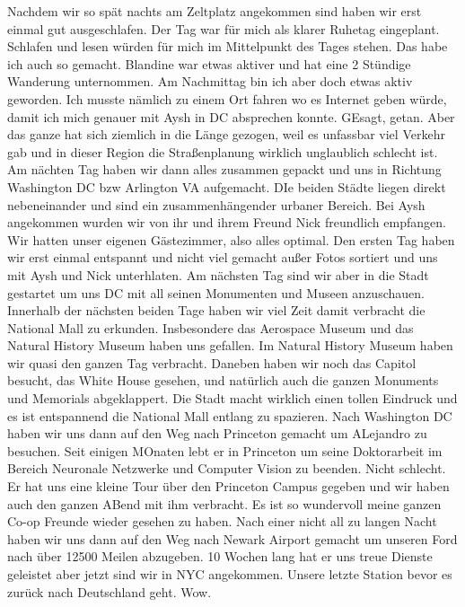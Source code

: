 \documentclass[11pt]{book}
\begin{document}
Nachdem wir so spät nachts am Zeltplatz angekommen sind haben wir erst einmal gut ausgeschlafen. Der Tag war für mich als klarer Ruhetag eingeplant. Schlafen und 
lesen würden für mich im Mittelpunkt des Tages stehen. Das habe ich auch so gemacht. Blandine war etwas aktiver und hat eine 2 Stündige Wanderung unternommen. 
Am Nachmittag bin ich aber doch etwas aktiv geworden. Ich musste nämlich zu einem Ort fahren wo es Internet geben würde, damit ich mich genauer mit Aysh in DC 
absprechen konnte. GEsagt, getan. Aber das ganze hat sich ziemlich in die Länge gezogen, weil es unfassbar viel Verkehr gab und in dieser Region die Straßenplanung 
wirklich unglaublich schlecht ist. Am nächten Tag haben wir dann alles zusammen gepackt und uns in Richtung Washington DC bzw Arlington VA aufgemacht. DIe beiden 
Städte liegen direkt nebeneinander und sind ein zusammenhängender urbaner Bereich. Bei Aysh angekommen wurden wir von ihr und ihrem Freund Nick freundlich 
empfangen. Wir hatten unser eigenen Gästezimmer, also alles optimal. Den ersten Tag haben wir erst einmal entspannt und nicht viel gemacht außer Fotos sortiert 
und uns mit Aysh und Nick unterhlaten. Am nächsten Tag sind wir aber in die Stadt gestartet um uns DC mit all seinen Monumenten und Museen anzuschauen. Innerhalb 
der nächsten beiden Tage haben wir viel Zeit damit verbracht die National Mall zu erkunden. Insbesondere das Aerospace Museum und das Natural History Museum haben 
uns gefallen. Im Natural History Museum haben wir quasi den ganzen Tag verbracht. Daneben haben wir noch das Capitol besucht, das White House gesehen, und natürlich 
auch die ganzen Monuments und Memorials abgeklappert. Die Stadt macht wirklich einen tollen Eindruck und es ist entspannend die National Mall entlang zu spazieren. 
Nach Washington DC haben wir uns dann auf den Weg nach Princeton gemacht um ALejandro zu besuchen. Seit einigen MOnaten lebt er in Princeton um seine Doktorarbeit 
im Bereich Neuronale Netzwerke und Computer Vision zu beenden. Nicht schlecht. Er hat uns eine kleine Tour über den Princeton Campus gegeben und wir haben auch den 
ganzen ABend mit ihm verbracht. Es ist so wundervoll meine ganzen Co-op Freunde wieder gesehen zu haben. Nach einer nicht all zu langen Nacht haben wir uns dann 
auf den Weg nach Newark Airport gemacht um unseren Ford nach über 12500 Meilen abzugeben. 10 Wochen lang hat er uns treue Dienste geleistet aber jetzt 
sind wir in NYC angekommen. Unsere letzte Station bevor es zurück nach Deutschland geht. Wow. 
\end{document}
